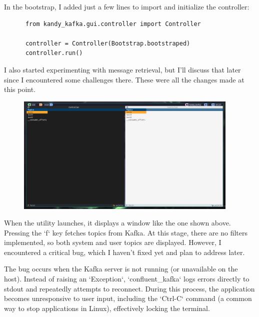 \documentclass[10pt , a4paper]{report}
\newenvironment{code}{\captionsetup{type=listing}}{}
\begin{document}
In the bootstrap, I added just a few lines to import and initialize the controller:

\begin{code}
  \begin{verbatim}
      from kandy_kafka.gui.controller import Controller
      
      controller = Controller(Bootstrap.bootstraped)
      controller.run()
  \end{verbatim}
\end{code}

I also started experimenting with message retrieval, but I’ll discuss that later since I encountered some challenges there. These were all the changes made at this point.

\begin{figure}[htbp]
  \begin{center}
    \includegraphics[width=0.95\textwidth]{imgs/TextualFirstScreen.png}
  \end{center}
  \caption{}\label{fig:}
\end{figure}

When the utility launches, it displays a window like the one shown above. Pressing the `f` key fetches topics from Kafka. At this stage, there are no filters implemented, so both system and user topics are displayed. However, I encountered a critical bug, which I haven’t fixed yet and plan to address later.

The bug occurs when the Kafka server is not running (or unavailable on the host). Instead of raising an `Exception`, `confluent\_kafka` logs errors directly to stdout and repeatedly attempts to reconnect. During this process, the application becomes unresponsive to user input, including the `Ctrl-C` command (a common way to stop applications in Linux), effectively locking the terminal.
\end{document}
